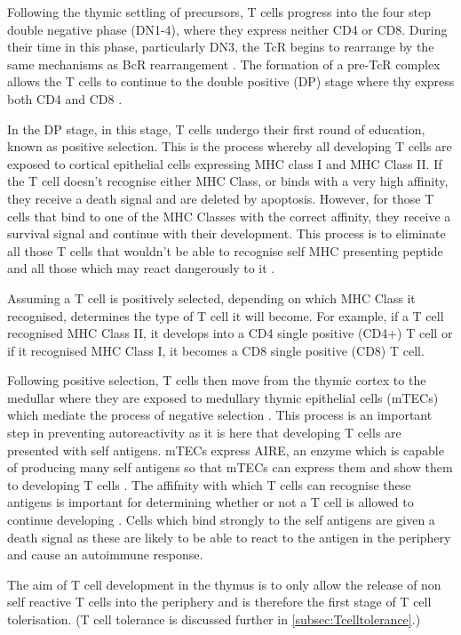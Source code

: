 Following the thymic settling of precursors, T cells progress into the four step double negative phase (DN1-4), where they express neither CD4 or CD8.
During their time in this phase, particularly DN3, the TcR begins to rearrange by the same mechanisms as BcR rearrangement \citep{Starr2003}.
The formation of a pre-TcR complex allows the T cells to continue to the double positive (DP) stage where thy express both CD4 and CD8 \citep{Zuniga1996}.

In the DP stage, in this stage, T cells undergo their first round of education, known as positive selection.
This is the process whereby all developing T cells are exposed to cortical epithelial cells expressing MHC class I and MHC Class II.
If the T cell doesn't recognise either MHC Class, or binds with a very high affinity, they receive a death signal and are deleted by apoptosis.
However, for those T cells that bind to one of the MHC Classes with the correct affinity, they receive a survival signal and continue with their development.
This process is to eliminate all those T cells that wouldn't be able to recognise self MHC presenting peptide and all those which  may react dangerously to it \citep{Jameson1998, Starr2003}.

Assuming a T cell is positively selected, depending on which MHC Class it recognised, determines the type of T cell it will become.
For example, if a T cell recognised MHC Class II, it develops into a CD4 single positive (CD4+) T cell or if it recognised MHC Class I, it becomes a CD8 single positive (CD8) T cell.

Following positive selection, T cells then move from the thymic cortex to the medullar where they are exposed to medullary thymic epithelial cells (mTECs) which mediate the process of negative selection \citep{Starr2003}.
This process is an important step in preventing autoreactivity as it is here that developing T cells are presented with self antigens.
mTECs express AIRE, an enzyme which is capable of producing many self antigens so that mTECs can express them and show them to developing T cells \citep{Anderson2011}.
The affifnity with which T cells can recognise these antigens is important for determining whether or not a T cell is allowed to continue developing \citep{Ashton1994}.
Cells which bind strongly to the self antigens are given a death signal as these are likely to be able to react to the antigen in the periphery and cause an autoimmune response.

The aim of T cell development in the thymus is to only allow the release of non self reactive T cells into the periphery and is therefore the first stage of T cell tolerisation. 
(T cell tolerance is discussed further in \cref{subsec:Tcelltolerance}.)

